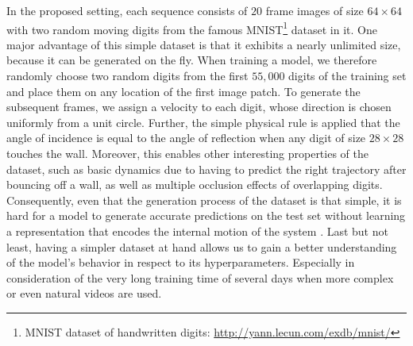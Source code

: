 In the proposed setting, each sequence consists of $20$ frame images of size $ 64 \times 64 $ with two random moving digits from the famous MNIST\footnote{MNIST dataset of handwritten digits: \url{http://yann.lecun.com/exdb/mnist/}} dataset in it. One major advantage of this simple dataset is that it exhibits a nearly unlimited size, because it can be generated on the fly. When training a model, we therefore randomly choose two random digits from the first $55,000$ digits of the training set and place them on any location of the first image patch. To generate the subsequent frames, we assign a velocity to each digit, whose direction is chosen uniformly from a unit circle. Further, the simple physical rule is applied that the angle of incidence is equal to the angle of reflection when any digit of size $ 28 \times 28 $ touches the wall. Moreover, this enables other interesting properties of the dataset, such as basic dynamics due to having to predict the right trajectory after bouncing off a wall, as well as multiple occlusion effects of overlapping digits. Consequently, even that the generation process of the dataset is that simple, it is hard for a model to generate accurate predictions on the test set without learning a representation that encodes the internal motion of the system \parencite[p. 6]{conv_lstm_nowcasting}. Last but not least, having a simpler dataset at hand allows us to gain a better understanding of the model's behavior in respect to its hyperparameters. Especially in consideration of the very long training time of several days when more complex or even natural videos are used.

